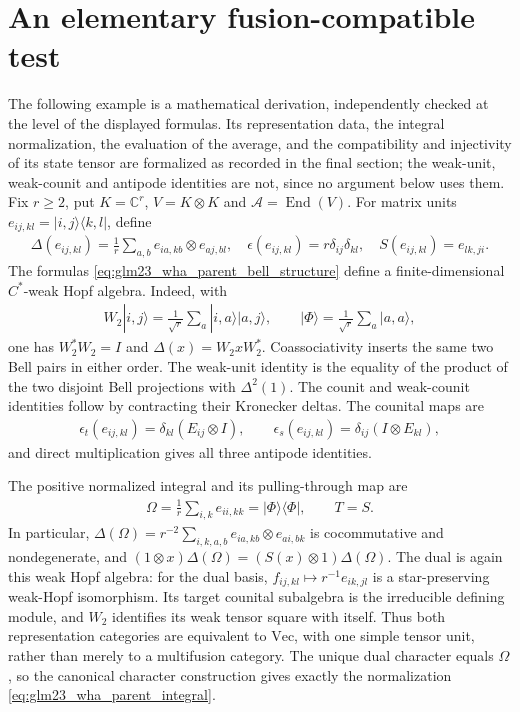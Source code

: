 \documentclass{article}
\begin{document}
\section{An elementary fusion-compatible test}
The following example is a mathematical derivation, independently checked
at the level of the displayed formulas. Its representation data, the
integral normalization, the evaluation of the average, and the
compatibility and injectivity of its state tensor are formalized as
recorded in the final section; the weak-unit, weak-counit and antipode
identities are not, since no argument below uses them.
Fix $r\ge2$, put $K=\mathbb C^r$, $V=K\otimes K$ and
$\mathcal A=\operatorname{End}(V)$. For matrix units
$e_{ij,kl}=|i,j\rangle\langle k,l|$, define
\begin{align}
    \Delta(e_{ij,kl})=\frac1r\sum_{a,b}e_{ia,kb}\otimes e_{aj,bl},\quad
    \epsilon(e_{ij,kl})=r\delta_{ij}\delta_{kl},\quad
    S(e_{ij,kl})=e_{lk,ji}.
    \label{eq:glm23_wha_parent_bell_structure}
\end{align}
The formulas \eqref{eq:glm23_wha_parent_bell_structure} define a finite-dimensional $C^*$-weak Hopf algebra.
Indeed, with
\begin{align}
    W_2|i,j\rangle=\frac1{\sqrt r}\sum_a|i,a\rangle|a,j\rangle,
    \qquad |\Phi\rangle=\frac1{\sqrt r}\sum_a|a,a\rangle,
    \label{eq:glm23_wha_parent_bell_isometry}
\end{align}
one has $W_2^*W_2=I$ and $\Delta(x)=W_2xW_2^*$. Coassociativity
inserts the same two Bell pairs in either order. The weak-unit identity
is the equality of the product of the two disjoint Bell projections
with $\Delta^2(1)$. The counit and weak-counit identities follow by
contracting their Kronecker deltas. The counital maps are
\begin{align}
    \epsilon_t(e_{ij,kl})=\delta_{kl}(E_{ij}\otimes I),\qquad
    \epsilon_s(e_{ij,kl})=\delta_{ij}(I\otimes E_{kl}),
    \label{eq:glm23_wha_parent_counital_maps}
\end{align}
and direct multiplication gives all three antipode identities.

The positive normalized integral and its pulling-through map are
\begin{align}
    \Omega=\frac1r\sum_{i,k}e_{ii,kk}=|\Phi\rangle\langle\Phi|,
    \qquad T=S.
    \label{eq:glm23_wha_parent_integral}
\end{align}
In particular, $\Delta(\Omega)=r^{-2}\sum_{i,k,a,b}
    e_{ia,kb}\otimes e_{ai,bk}$ is cocommutative and nondegenerate, and
$(1\otimes x)\Delta(\Omega)=(S(x)\otimes1)\Delta(\Omega)$.
The dual is again this weak Hopf algebra: for the dual basis,
$f_{ij,kl}\mapsto r^{-1}e_{ik,jl}$ is a star-preserving weak-Hopf
isomorphism. Its target counital subalgebra is the irreducible defining
module, and $W_2$ identifies its weak tensor square with itself. Thus
both representation categories are equivalent to $\mathrm{Vec}$, with
one simple tensor unit, rather than merely to a multifusion category.
The unique dual character equals $\Omega$, so the canonical character
construction gives exactly the normalization
\eqref{eq:glm23_wha_parent_integral}.
\end{document}
